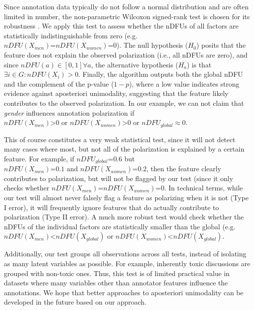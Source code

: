 Since annotation data typically do not follow a normal distribution and are often limited in number, the non-parametric Wilcoxon signed-rank test is chosen for its robustness \cite{Rey2011}. We apply this test to assess whether the \acp{nDFU} of all factors are statistically indistinguishable from zero (e.g. $nDFU(X_{men}) \text{=} nDFU(X_{women}) \text{=} 0$). The null hypothesis ($H_0$) posits that the feature does not explain the observed polarization (i.e., all \acp{nDFU} are zero), and since $nDFU(a) \in [0,1] \forall a$, the alternative hypothesis ($H_a$) is that $\exists i \in G: nDFU(X_i) > 0$. Finally, the algorithm outputs both the global \ac{nDFU} and the complement of the p-value ($1 - p$), where a low value indicates strong evidence against aposteriori unimodality, suggesting that the feature likely contributes to the observed polarization. In our example, we can not claim that \textit{gender} influences annotation polarization if $nDFU(X_{men}) \text{>} 0 \text{ or } nDFU(X_{women}) \text{>} 0 \text{ or } nDFU_{global} \approx 0$.

This of course constitutes a very weak statistical test, since it will not detect many cases where most, but not all of the polarization is explained by a certain feature. For example, if $nDFU_{global} \text{=} 0.6$ but  $nDFU(X_{men}) \text{=} 0.1 \text{ and } nDFU(X_{women}) \text{=} 0.2$, then the feature clearly contributes to polarization, but will not be flagged by our test (since it only checks whether $nDFU(X_{men}) \text{=} nDFU(X_{women}) \text{=} 0$. In technical terms, while our test will almost never falsely flag a feature as polarizing when it is not (Type I error), it will frequently ignore features that do actually contribute to polarization (Type II error). A much more robust test would check whether the \acp{nDFU} of the individual factors are statistically smaller than the global (e.g. $nDFU(X_{men}) \text{<} nDFU(X_{global}) \text{ or } nDFU(X_{women}) \text{<} nDFU(X_{global})$.

Additionally, our test groups all observations across all tests, instead of isolating as many latent variables as possible. For example, inherently toxic discussions are grouped with non-toxic ones. Thus, this test is of limited practical value in datasets where many variables other than annotator features influence the annotations. We hope that better approaches to aposteriori unimodality can be developed in the future based on our approach.

